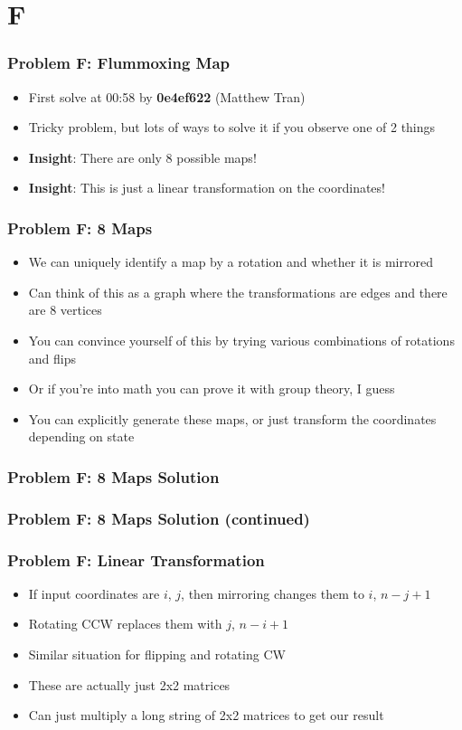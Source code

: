 \section{F}%
\label{sec:f}

\begin{frame}
  \frametitle{Problem F: Flummoxing Map}

  \begin{itemize}
    \item First solve at 00:58 by \textbf{0e4ef622} (Matthew Tran)
    \item Tricky problem, but lots of ways to solve it if you observe one of 2 things
    \item \textbf{Insight}: There are only 8 possible maps!
    \item \textbf{Insight}: This is just a linear transformation on the coordinates!
  \end{itemize}

\end{frame}

\begin{frame}
  \frametitle{Problem F: 8 Maps}
  \begin{itemize}
    \item We can uniquely identify a map by a rotation and whether it is mirrored
    \item Can think of this as a graph where the transformations are edges and there are 8 vertices
    \item You can convince yourself of this by trying various combinations of rotations and flips
    \item Or if you're into math you can prove it with group theory, I guess
    \item You can explicitly generate these maps, or just transform the coordinates depending on state
  \end{itemize}
\end{frame}

\begin{frame}
  \frametitle{Problem F: 8 Maps Solution}
\end{frame}

\begin{frame}
  \frametitle{Problem F: 8 Maps Solution (continued)}
\end{frame}

\begin{frame}
  \frametitle{Problem F: Linear Transformation}
  \begin{itemize}
    \item If input coordinates are $i$, $j$, then mirroring changes them to $i$, $n-j+1$
    \item Rotating CCW replaces them with $j$, $n-i+1$
    \item Similar situation for flipping and rotating CW
    \item These are actually just 2x2 matrices
    \item Can just multiply a long string of 2x2 matrices to get our result
  \end{itemize}
\end{frame}
